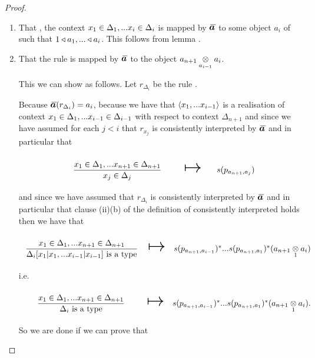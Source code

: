 \begin{proof}
\begin{enumerate}
\item That \foreachi, the context $\xDelta{i}$ is mapped by $\Ibar$ to some object $a_i$ of \catcw such
that $1 \base a_1,...\base a_i$. This follows from lemma . 

\item That the rule  is mapped by $\Ibar$ to the object $\crossx{a_{n+1}}{a_i}{a_{i-1}}$.

This we can show as follows.
\newcommand{\deltaimapped}{\crossx{a_{n+1}}{a_i}{a_{i-1}}}
\newcommand{\deltaimappedlong}{s(p_{a_{n+1},a_{i-1}})^*...s(p_{a_{n+1},a_1})^*(\crossx{a_{n+1}}{a_i}{1})}
Let $r_{\Delta_i}$ be the rule .



Because $\Ibar(r_{\Delta_i}) = a_i$,
because  we have that
$\tuple{x_1,...x_{i-1}}$ is a realisation of context $\xDelta{i-1}$ with respect to context $\Delta_{n+1}$ 
and since we have assumed for each $j<i$ that $r_{x_j}$ is consistently interpreted by $\Ibar$ and in particular
that
\begin{equation*}
\begin{array}{c c c }
\forceSOURCEwidth & & \forceTARGETwidth \\ [-0.1cm]
\gatdisplayrule{\xDelta{n+1}}{\ofT{x_j}{\Delta_j}}  & \Imapsto & s(p_{a_{n+1},a_j}) \\ [0.4cm]
\end{array}
\end{equation*}
and since we have assumed that $r_{\Delta_i}$ is consistently interpreted by $\Ibar$ and in particular that clause (ii)(b) of the definition of consistently interpreted holds
then we have that
\begin{equation*}
\begin{array}{c c c}
\forceSOURCEwidth & & \forceTARGETwidth \\ [-0.1cm]
\gatdisplayrule{\xDelta{n+1}}{\isT{\Delta_i[x_1|x_1,...x_{i-1}|x_{i-1}]}}  & \Imapsto & \deltaimappedlong \\ [0.4cm]
\end{array}
\end{equation*}
i.e.
\begin{equation*}
\begin{array}{c c c}
\forceSOURCEwidth & & \forceTARGETwidth \\ [-0.1cm]
\DDelta{n+1}{i}  & \Imapsto & \deltaimappedlong.\\ [0.4cm]
\end{array}
\end{equation*}
So we are done if we can prove that


\end{enumerate}
\end{proof}

